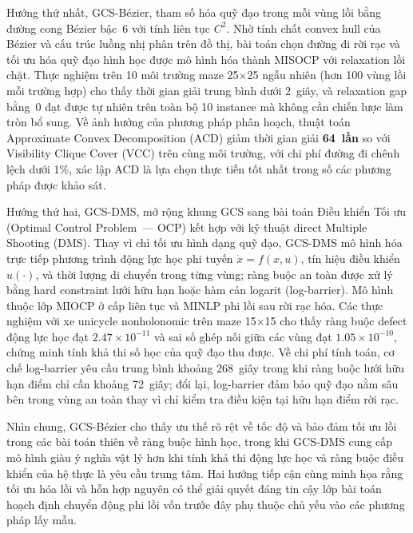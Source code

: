 Hướng thứ nhất, GCS-Bézier, tham số hóa quỹ đạo trong mỗi vùng lồi bằng đường cong Bézier bậc~6 với tính liên tục $C^2$.
Nhờ tính chất convex hull của Bézier và cấu trúc luồng nhị phân trên đồ thị, bài toán chọn đường đi rời rạc và tối ưu hóa quỹ đạo hình học được mô hình hóa thành MISOCP với relaxation lồi chặt.
Thực nghiệm trên 10 môi trường maze 25$\times$25 ngẫu nhiên (hơn 100 vùng lồi mỗi trường hợp) cho thấy thời gian giải trung bình dưới 2~giây, và relaxation gap bằng~0 đạt được tự nhiên trên toàn bộ 10 instance mà không cần chiến lược làm tròn bổ sung.
Về ảnh hưởng của phương pháp phân hoạch, thuật toán Approximate Convex Decomposition (ACD) giảm thời gian giải \textbf{64~lần} so với Visibility Clique Cover (VCC) trên cùng môi trường, với chi phí đường đi chênh lệch dưới 1\%, xác lập ACD là lựa chọn thực tiễn tốt nhất trong số các phương pháp được khảo sát.

Hướng thứ hai, GCS-DMS, mở rộng khung GCS sang bài toán Điều khiển Tối ưu (Optimal Control Problem~--- OCP) kết hợp với kỹ thuật direct Multiple Shooting (DMS).
Thay vì chỉ tối ưu hình dạng quỹ đạo, GCS-DMS mô hình hóa trực tiếp phương trình động lực học phi tuyến $\dot x = f(x,u)$, tín hiệu điều khiển $u(\cdot)$, và thời lượng di chuyển trong từng vùng; ràng buộc an toàn được xử lý bằng hard constraint lưới hữu hạn hoặc hàm cản logarit (log-barrier).
Mô hình thuộc lớp MIOCP ở cấp liên tục và MINLP phi lồi sau rời rạc hóa.
Các thực nghiệm với xe unicycle nonholonomic trên maze 15$\times$15 cho thấy ràng buộc defect động lực học đạt $2.47\times10^{-11}$ và sai số ghép nối giữa các vùng đạt $1.05\times10^{-10}$, chứng minh tính khả thi số học của quỹ đạo thu được.
Về chi phí tính toán, cơ chế log-barrier yêu cầu trung bình khoảng 268~giây trong khi ràng buộc lưới hữu hạn điểm chỉ cần khoảng 72~giây; đổi lại, log-barrier đảm bảo quỹ đạo nằm sâu bên trong vùng an toàn thay vì chỉ kiểm tra điều kiện tại hữu hạn điểm rời rạc.

Nhìn chung, GCS-Bézier cho thấy ưu thế rõ rệt về tốc độ và bảo đảm tối ưu lồi trong các bài toán thiên về ràng buộc hình học, trong khi GCS-DMS cung cấp mô hình giàu ý nghĩa vật lý hơn khi tính khả thi động lực học và ràng buộc điều khiển của hệ thực là yêu cầu trung tâm.
Hai hướng tiếp cận cùng minh họa rằng tối ưu hóa lồi và hỗn hợp nguyên có thể giải quyết đáng tin cậy lớp bài toán hoạch định chuyển động phi lồi vốn trước đây phụ thuộc chủ yếu vào các phương pháp lấy mẫu.
